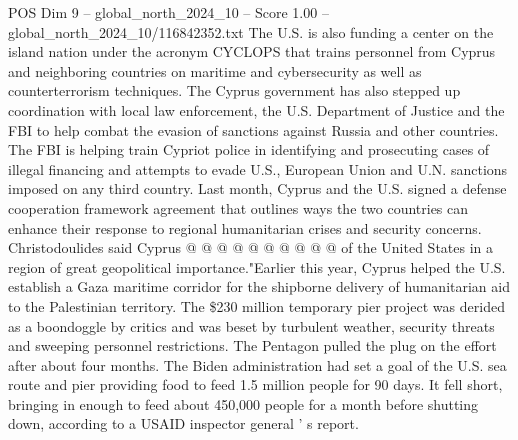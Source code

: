 \begin{textsample}{POS Dim 9 – global\_north\_2024\_10 – Score 1.00 – global\_north\_2024\_10/116842352.txt}
The U.S. is also funding a center on the island nation under the acronym CYCLOPS that trains personnel from Cyprus and neighboring countries on maritime and cybersecurity as well as counterterrorism techniques.
The Cyprus government has also stepped up coordination with local law enforcement, the U.S.
Department of Justice and the FBI to help combat the evasion of sanctions against Russia and other countries.
The FBI is helping train Cypriot police in identifying and prosecuting cases of illegal financing and attempts to evade U.S., European Union and U.N. sanctions imposed on any third country.
Last month, Cyprus and the U.S. signed a defense cooperation framework agreement that outlines ways the two countries can enhance their response to regional humanitarian crises and security concerns.
Christodoulides said Cyprus @ @ @ @ @ @ @ @ @ @ of the United States in a region of great geopolitical importance."Earlier this year, Cyprus helped the U.S. establish a Gaza maritime corridor for the shipborne delivery of humanitarian aid to the Palestinian territory.
The \$230 million temporary pier project was derided as a boondoggle by critics and was beset by turbulent weather, security threats and sweeping personnel restrictions.
The Pentagon pulled the plug on the effort after about four months.
The Biden administration had set a goal of the U.S. sea route and pier providing food to feed 1.5 million people for 90 days.
It fell short, bringing in enough to feed about 450,000 people for a month before shutting down, according to a USAID inspector general ' s report.

\end{textsample}
